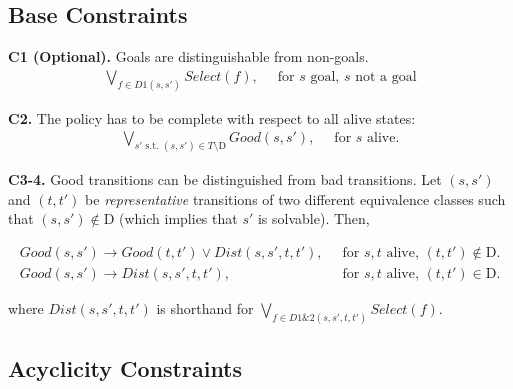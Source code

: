 \documentclass[a4paper]{article}
\newcommand{\smallpar}[1]{{\vspace{10pt}\noindent \bf #1.}}
\newcommand{\badtx}{\ensuremath{\mathrm{D}}}
\begin{document}


\subsection{Base Constraints}

\smallpar{C1 (Optional)}
Goals are distinguishable from non-goals.
\begin{align}
\bigvee_{f \in D1(s, s')} Select(f),&\;\; \text{for $s$ goal, $s$ not a goal}
\end{align}


\smallpar{C2}
The policy has to be complete with respect to all alive states:
\begin{align}
\bigvee_{s' \text{ s.t. } (s, s') \in T \setminus \badtx} Good(s, s'),&\;\; \text{for $s$ alive.}
\end{align}

\smallpar{C3-4}
Good transitions can be distinguished from bad transitions.
Let $(s, s')$ and $(t, t')$ be \emph{representative} transitions
of two different equivalence classes such that $(s, s') \not\in \badtx$
(which implies that $s'$ is solvable). Then,

\begin{align}
 Good(s, s') \rightarrow Good(t, t') \lor
 Dist(s, s', t, t'),&\;\; \text{for $s, t$ alive, $(t, t') \not\in \badtx$.} \\
 Good(s, s') \rightarrow
 Dist(s, s', t, t'),&\;\; \text{for $s, t$ alive, $(t, t') \in \badtx$.}
\end{align}

\noindent where $Dist(s, s', t, t')$ is shorthand for $\bigvee_{f \in D1\&2(s, s', t, t')} Select(f)$.

\subsection{Acyclicity Constraints}
\end{document}
